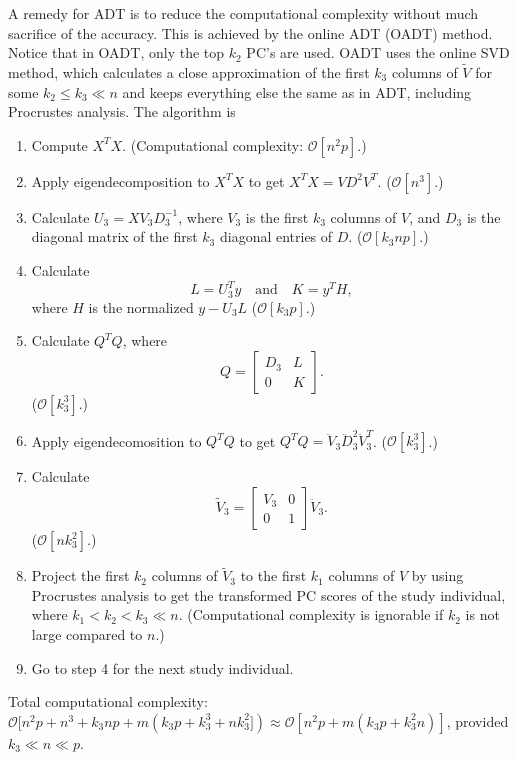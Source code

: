 \documentclass{article}
\newcommand{\bO}{\mathcal{O}}
\begin{document}
A remedy for ADT is to reduce the computational complexity without much sacrifice of the accuracy.
This is achieved by the online ADT (OADT) method.
Notice that in OADT, only the top $k_2$ PC's are used.
OADT uses the online SVD method, which calculates a close approximation of the first $k_3$ columns of $\tilde{V}$ for some $k_2 \leq k_3 \ll n$ and keeps everything else the same as in ADT, including Procrustes analysis. 
The algorithm is
\begin{enumerate}
\item Compute $X^T X$.
  (Computational complexity: $\bO[n^2p]$.)  
\item Apply eigendecomposition to $X^T X$ to get $X^T X = V D^2 V^T$.
  ($\bO[n^3]$.)
\item Calculate $U_3 = X V_3 D_3^{-1}$,
  where $V_3$ is the first $k_3$ columns of $V$,
  and $D_3$ is the diagonal matrix of the first $k_3$ diagonal entries of $D$.
  ($\bO[k_3 n p]$.)
\item Calculate 
  \[
    L = U_3^T y \quad \text{and} \quad K = y^T H,
  \]
  where $H$ is the normalized  $y - U_3L$
  ($\bO[k_3 p]$.)
\item Calculate $Q^T Q$, where
  \[
    Q = 
    \begin{bmatrix}
      D_3 & L \\
      0 & K
    \end{bmatrix}.
  \]
  ($\bO[k_3^3]$.)
\item Apply eigendecomosition to $Q^T Q$ to get $Q^T Q = \ddot{V}_3 \ddot{D}^2_3 \ddot{V}^T_3$.
  ($\bO[k_3^3]$.)
\item Calculate
  \[
    \tilde{V}_3 =
    \begin{bmatrix}
      V_3 & 0 \\
      0 & 1
    \end{bmatrix}
    \ddot{V}_3.
  \]
  ($\bO[nk_3^2]$.)
\item Project the first $k_2$ columns of $\tilde{V}_3$ to the first $k_1$ columns of $V$ by using Procrustes analysis to get the transformed PC scores of the study individual,
  where $k_1 < k_2  < k_3 \ll n$.
  (Computational complexity is ignorable if $k_2$ is not large compared to $n$.)
  \item Go to step 4 for the next study individual.
\end{enumerate}

Total computational complexity: $\bO[n^2p + n^3 + k_3np + m(k_3p + k_3^3 + nk_3^2]) \approx \bO[n^2p + m(k_3p + k_3^2n)]$, provided $k_3 \ll n \ll p$.
\end{document}

